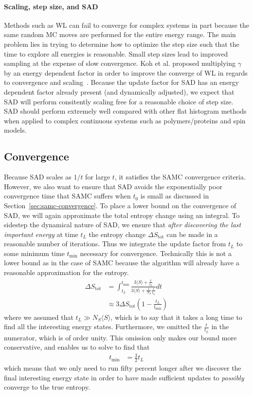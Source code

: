\documentclass[letterpaper,twocolumn,amsmath,amssymb,pre,aps,10pt]{revtex4-1}
\begin{document}
\paragraph{Scaling, step size, and SAD}
Methods such as WL can fail to converge for complex systems in part
because the same random MC moves are performed for the entire energy
range.  The main problem lies in trying to determine how to optimize
the step size such that the time to explore all energies is reasonable.
Small step sizes lead to improved sampling at the expense of slow
convergence. Koh et al. proposed multiplying $\gamma$ by an energy
dependent factor in order to improve the converge of WL in regards to
convergence and scaling~\cite{koh2013dynamically}.  Because the update
factor for SAD has an energy dependent factor already present (and
dynamically adjusted), we expect that SAD will perform consitently
scaling free for a reasonable choice of step size.  SAD should perform
extremely well compared with other flat histogram methods when applied
to complex continuous systems such as polymers/proteins and spin models.

\subsection{Convergence}
Because SAD scales as $1/t$ for large $t$, it satisfies the SAMC
convergence criteria.  However, we also want to ensure that SAD avoids
the exponentially poor convergence time that SAMC suffers when $t_0$ is
small as discussed in Section~\ref{sec:samc-convergence}.
To place a lower bound on the convergence of SAD, we will again
approximate the total entropy change using an integral.  To sidestep
the dynamical nature of SAD, we ensure that \emph{after discovering the
last important energy} at time $t_L$ the entropy change
$\Delta S_{\text{tot}}$ can be made in a reasonable number of iterations.
Thus we integrate the update factor from $t_L$ to some minimum time
$t_{\min}$ necessary for convergence.  Technically this is not a lower
bound as in the case of SAMC because the algorithm will already have a
reasonable approximation for the entropy.
\begin{align}
\Delta S_{\text{tot}} &= \int_{t_L}^{t_{\min}}
     \frac{
       3\langle S\rangle + \frac{t}{t_L}
     }{
       3\langle S\rangle + \frac{t}{N_S}\frac{t}{t_L}
     } dt \\
&\approx 3\Delta S_{\text{tot}} \left(1-\frac{t_L}{t_{\min}}\right)
\end{align}
where we assumed that $t_L\gg N_S\langle S\rangle$, which is to say
that it takes a long time to find all the interesting energy states.
Furthermore, we omitted the $\frac{t}{t_L}$ in the numerator, which is
of order unity.  This omission only makes our bound more conservative,
and enables us to solve to find that
\begin{align}
  t_{\min} &= \frac32 t_L
\end{align}
which means that we only need to run fifty percent longer after we
discover the final interesting energy state in order to have made
sufficient updates to \emph{possibly} converge to the true entropy.
\end{document}
